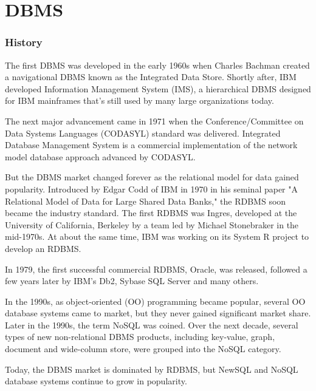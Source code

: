 \documentclass[11pt,a4paper,twoside]{article}
\begin{document}
\part{DBMS}
\section{History}
The first DBMS was developed in the early 1960s when Charles Bachman created a navigational DBMS known as the Integrated Data Store. Shortly after, IBM developed Information Management System (IMS), a hierarchical DBMS designed for IBM mainframes that's still used by many large organizations today.\par
The next major advancement came in 1971 when the Conference/Committee on Data Systems Languages (CODASYL) standard was delivered. Integrated Database Management System is a commercial implementation of the network model database approach advanced by CODASYL.\par
But the DBMS market changed forever as the relational model for data gained popularity. Introduced by Edgar Codd of IBM in 1970 in his seminal paper "A Relational Model of Data for Large Shared Data Banks," the RDBMS soon became the industry standard. The first RDBMS was Ingres, developed at the University of California, Berkeley by a team led by Michael Stonebraker in the mid-1970s. At about the same time, IBM was working on its System R project to develop an RDBMS.\par
In 1979, the first successful commercial RDBMS, Oracle, was released, followed a few years later by IBM's Db2, Sybase SQL Server and many others.\par
In the 1990s, as object-oriented (OO) programming became popular, several OO database systems came to market, but they never gained significant market share. Later in the 1990s, the term NoSQL was coined. Over the next decade, several types of new non-relational DBMS products, including key-value, graph, document and wide-column store, were grouped into the NoSQL category.\par
Today, the DBMS market is dominated by RDBMS, but NewSQL and NoSQL database systems continue to grow in popularity.
\end{document}
